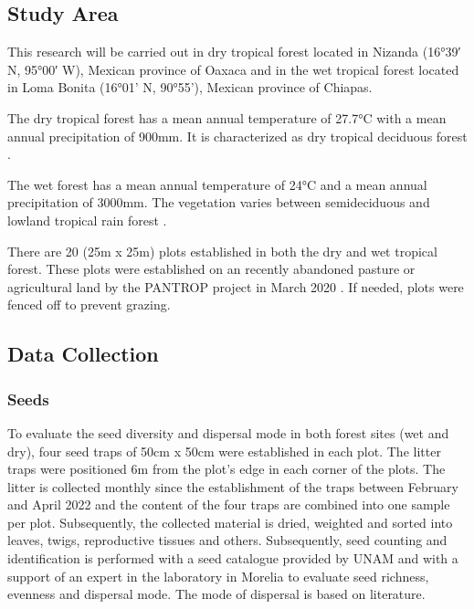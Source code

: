 

\subsection{Study Area}
This research will be carried out in dry tropical forest located in Nizanda (16°39′ N, 95°00′ W), Mexican province of Oaxaca and in the wet tropical forest located in Loma Bonita (16°01’ N, 90°55’), Mexican province of Chiapas. 

The dry tropical forest has a mean annual temperature of 27.7°C with a mean annual precipitation of 900mm. It is characterized as dry tropical deciduous forest \citep{hordijkLandUseHistory2024}. 

The wet forest has a mean annual temperature of 24°C and a mean annual precipitation of 3000mm. The vegetation varies between semideciduous and lowland tropical rain forest \citep{hordijkLandUseHistory2024}.

There are 20 (25m x 25m) plots established in both the dry and wet tropical forest. These plots were established on an recently abandoned pasture or agricultural land by the PANTROP project in March 2020 \citep{hordijkLandUseHistory2024}. If needed, plots were fenced off to prevent grazing. 


\subsection{Data Collection}

\subsubsection{Seeds}
To evaluate the seed diversity and dispersal mode in both forest sites (wet and dry), four seed traps of 50cm x 50cm were established in each plot. The litter traps were positioned 6m from the plot's edge in each corner of the plots. The litter is collected monthly since the establishment of the traps between February and April 2022 and the content of the four traps are combined into one sample per plot. 
Subsequently, the collected material is dried, weighted and sorted into leaves, twigs, reproductive tissues and others. Subsequently, seed counting and identification is performed with a seed catalogue provided by UNAM and with a support of an expert in the laboratory in Morelia to evaluate seed richness, evenness and dispersal mode. The mode of dispersal is based on literature.

